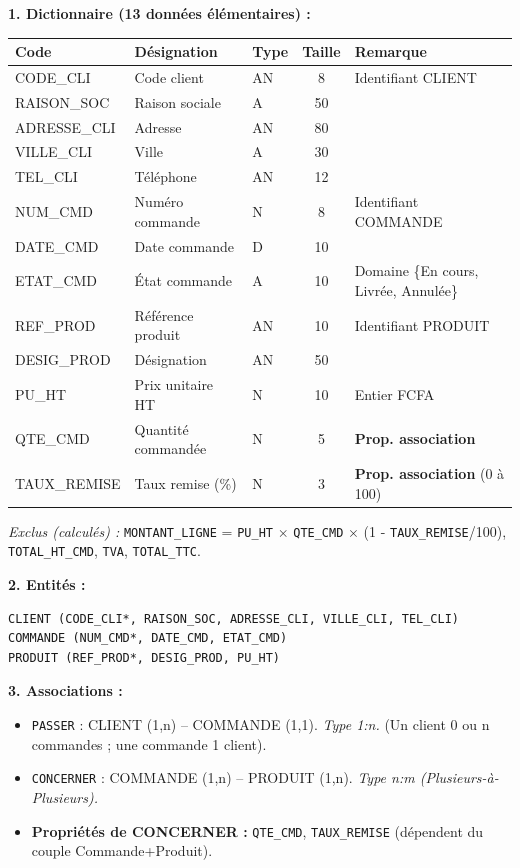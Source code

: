 \documentclass[11pt]{article}
\begin{document}
\begin{corrige}
\textbf{1. Dictionnaire (13 données élémentaires) :}
\begin{center}
\begin{tabularx}{\linewidth}{|l|X|l|c|X|}
\hline
\rowcolor{popblueL} \textbf{Code} & \textbf{Désignation} & \textbf{Type} & \textbf{Taille} & \textbf{Remarque} \\
\hline
CODE\_CLI & Code client & AN & 8 & Identifiant CLIENT \\
\hline
RAISON\_SOC & Raison sociale & A & 50 & \\
\hline
ADRESSE\_CLI & Adresse & AN & 80 & \\
\hline
VILLE\_CLI & Ville & A & 30 & \\
\hline
TEL\_CLI & Téléphone & AN & 12 & \\
\hline
NUM\_CMD & Numéro commande & N & 8 & Identifiant COMMANDE \\
\hline
DATE\_CMD & Date commande & D & 10 & \\
\hline
ETAT\_CMD & État commande & A & 10 & Domaine \{En cours, Livrée, Annulée\} \\
\hline
REF\_PROD & Référence produit & AN & 10 & Identifiant PRODUIT \\
\hline
DESIG\_PROD & Désignation & AN & 50 & \\
\hline
PU\_HT & Prix unitaire HT & N & 10 & Entier FCFA \\
\hline
QTE\_CMD & Quantité commandée & N & 5 & \textbf{Prop. association} \\
\hline
TAUX\_REMISE & Taux remise (\%) & N & 3 & \textbf{Prop. association} (0 à 100) \\
\hline
\end{tabularx}
\end{center}
\textit{Exclus (calculés) :} \texttt{MONTANT\_LIGNE} = \texttt{PU\_HT} $\times$ \texttt{QTE\_CMD} $\times$ (1 - \texttt{TAUX\_REMISE}/100), \texttt{TOTAL\_HT\_CMD}, \texttt{TVA}, \texttt{TOTAL\_TTC}.

\textbf{2. Entités :}
\begin{lstlisting}
CLIENT (CODE_CLI*, RAISON_SOC, ADRESSE_CLI, VILLE_CLI, TEL_CLI)
COMMANDE (NUM_CMD*, DATE_CMD, ETAT_CMD)
PRODUIT (REF_PROD*, DESIG_PROD, PU_HT)
\end{lstlisting}

\textbf{3. Associations :}
\begin{itemize}
  \item \texttt{PASSER} : CLIENT (1,n) -- COMMANDE (1,1). \textit{Type 1:n.} (Un client 0 ou n commandes ; une commande 1 client).
  \item \texttt{CONCERNER} : COMMANDE (1,n) -- PRODUIT (1,n). \textit{Type n:m (Plusieurs-à-Plusieurs).}
  \item \textbf{Propriétés de CONCERNER :} \texttt{QTE\_CMD}, \texttt{TAUX\_REMISE} (dépendent du couple Commande+Produit).
\end{itemize}


\end{corrige}
\end{document}
